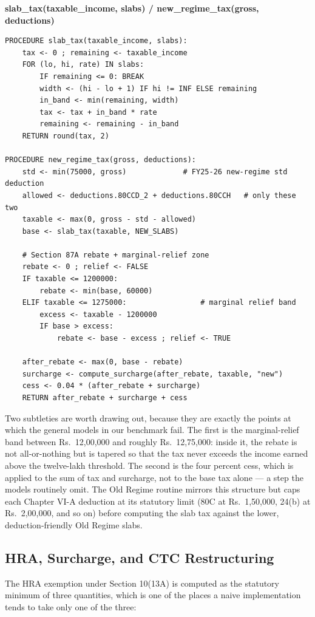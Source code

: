 \documentclass[12pt, a4paper, oneside]{report}
\newcommand{\algname}[1]{\par\vspace{0.6em}\noindent\textbf{\ttfamily #1}\nopagebreak}
\begin{document}
\algname{slab\_tax(taxable\_income, slabs) \quad / \quad new\_regime\_tax(gross, deductions)}
\begin{lstlisting}[style=pseudo]
PROCEDURE slab_tax(taxable_income, slabs):
    tax <- 0 ; remaining <- taxable_income
    FOR (lo, hi, rate) IN slabs:
        IF remaining <= 0: BREAK
        width <- (hi - lo + 1) IF hi != INF ELSE remaining
        in_band <- min(remaining, width)
        tax <- tax + in_band * rate
        remaining <- remaining - in_band
    RETURN round(tax, 2)

PROCEDURE new_regime_tax(gross, deductions):
    std <- min(75000, gross)             # FY25-26 new-regime std deduction
    allowed <- deductions.80CCD_2 + deductions.80CCH   # only these two
    taxable <- max(0, gross - std - allowed)
    base <- slab_tax(taxable, NEW_SLABS)

    # Section 87A rebate + marginal-relief zone
    rebate <- 0 ; relief <- FALSE
    IF taxable <= 1200000:
        rebate <- min(base, 60000)
    ELIF taxable <= 1275000:                 # marginal relief band
        excess <- taxable - 1200000
        IF base > excess:
            rebate <- base - excess ; relief <- TRUE

    after_rebate <- max(0, base - rebate)
    surcharge <- compute_surcharge(after_rebate, taxable, "new")
    cess <- 0.04 * (after_rebate + surcharge)
    RETURN after_rebate + surcharge + cess
\end{lstlisting}

Two subtleties are worth drawing out, because they are exactly the points at
which the general models in our benchmark fail. The first is the marginal-relief
band between Rs.~12,00,000 and roughly Rs.~12,75,000: inside it, the rebate is
not all-or-nothing but is tapered so that the tax never exceeds the income earned
above the twelve-lakh threshold. The second is the four percent cess, which is
applied to the sum of tax and surcharge, not to the base tax alone --- a step
the models routinely omit. The Old Regime routine mirrors this structure but
caps each Chapter VI-A deduction at its statutory limit (80C at Rs.~1,50,000,
24(b) at Rs.~2,00,000, and so on) before computing the slab tax against the
lower, deduction-friendly Old Regime slabs.

\subsection{HRA, Surcharge, and CTC Restructuring}
The HRA exemption under Section 10(13A) is computed as the statutory minimum of
three quantities, which is one of the places a naive implementation tends to
take only one of the three:
\end{document}
